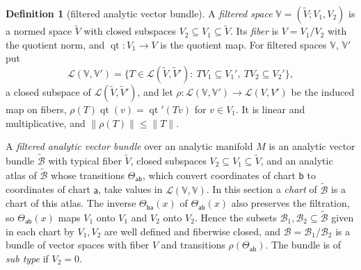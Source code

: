 \documentclass[11pt]{amsart}
\theoremstyle{definition}
\newtheorem{definition}[theorem]{Definition}
\theoremstyle{remark}
\numberwithin{equation}{section}
\newcommand{\cL}{\mathcal L}
\newcommand{\norm}[1]{\lVert #1\rVert}
\theoremstyle{plain}
\theoremstyle{definition}
\theoremstyle{plain}
\begin{document}
\begin{definition}[filtered analytic vector bundle]\label{amb:def:filtered}
A \emph{filtered space} $\mathbb V=(\tilde V;V_1,V_2)$ is a normed space $\tilde V$ with closed subspaces $V_2\subseteq V_1\subseteq\tilde V$. Its \emph{fiber} is $V=V_1/V_2$ with the quotient norm, and $\operatorname{qt}\colon V_1\to V$ is the quotient map. For filtered spaces $\mathbb V$, $\mathbb V'$ put
\[
 \cL(\mathbb V,\mathbb V')=\{T\in\cL(\tilde V,\tilde V'):\ TV_1\subseteq V_1',\ TV_2\subseteq V_2'\},
\]
a closed subspace of $\cL(\tilde V,\tilde V')$, and let $\rho\colon\cL(\mathbb V,\mathbb V')\to\cL(V,V')$ be the induced map on fibers, $\rho(T)\operatorname{qt}(v)=\operatorname{qt}'(Tv)$ for $v\in V_1$. It is linear and multiplicative, and $\norm{\rho(T)}\le\norm T$.

A \emph{filtered analytic vector bundle} over an analytic manifold $M$ is an analytic vector bundle $\widetilde{\mathcal B}$ with typical fiber $\tilde V$, closed subspaces $V_2\subseteq V_1\subseteq\tilde V$, and an analytic atlas of $\widetilde{\mathcal B}$ whose transitions $\Theta_{\mathsf{ab}}$, which convert coordinates of chart $\mathsf b$ to coordinates of chart $\mathsf a$, take values in $\cL(\mathbb V,\mathbb V)$. In this section a \emph{chart} of $\widetilde{\mathcal B}$ is a chart of this atlas. The inverse $\Theta_{\mathsf{ba}}(x)$ of $\Theta_{\mathsf{ab}}(x)$ also preserves the filtration, so $\Theta_{\mathsf{ab}}(x)$ maps $V_1$ onto $V_1$ and $V_2$ onto $V_2$. Hence the subsets $\mathcal B_1,\mathcal B_2\subseteq\widetilde{\mathcal B}$ given in each chart by $V_1,V_2$ are well defined and fiberwise closed, and $\mathcal B=\mathcal B_1/\mathcal B_2$ is a bundle of vector spaces with fiber $V$ and transitions $\rho(\Theta_{\mathsf{ab}})$. The bundle is of \emph{sub type} if $V_2=0$.
\end{definition}
\end{document}
